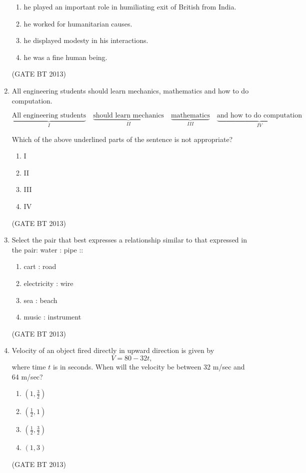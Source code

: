\documentclass[journal,12pt,onecolumn]{IEEEtran}
\theoremstyle{remark}
\begin{document}
\begin{enumerate}
\begin{enumerate}
    \item he played an important role in humiliating exit of British from India.
    \item he worked for humanitarian causes.
    \item he displayed modesty in his interactions.
    \item he was a fine human being.
\end{enumerate} \hfill(GATE BT 2013)

\item 

All engineering students should learn mechanics, mathematics and how to do computation.

\[
\underbrace{\text{All engineering students}}_{I} \quad
\underbrace{\text{should learn mechanics}}_{II} \quad
\underbrace{\text{mathematics}}_{III} \quad
\underbrace{\text{and how to do computation}}_{IV}
\]

Which of the above underlined parts of the sentence is not appropriate?

\begin{enumerate}
    \item I
    \item II
    \item III
    \item IV
\end{enumerate} \hfill(GATE BT 2013)

\item 

Select the pair that best expresses a relationship similar to that expressed in the pair:  
water : pipe ::

\begin{enumerate}
    \item cart : road
    \item electricity : wire
    \item sea : beach
    \item music : instrument
\end{enumerate} \hfill(GATE BT 2013)

\item 

Velocity of an object fired directly in upward direction is given by
\[
V = 80 - 32t,
\]
where time \(t\) is in seconds. When will the velocity be between 32 m/sec and 64 m/sec?

\begin{enumerate}
    \item \((1, \tfrac{3}{2})\)
    \item \(\left(\tfrac{1}{2}, 1\right)\)
    \item \(\left(\tfrac{1}{2}, \tfrac{3}{2}\right)\)
    \item \((1, 3)\)
\end{enumerate} \hfill(GATE BT 2013)


\end{enumerate}
\end{document}
